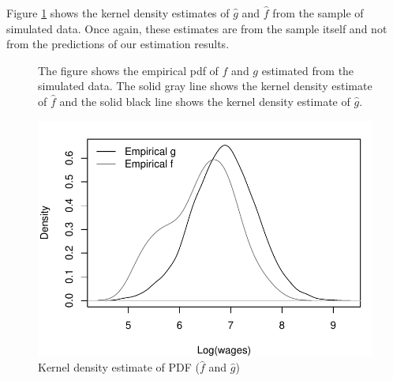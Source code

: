 \documentclass[11pt,letterpaper]{article}
\newcommand{\floatintro}[1]{
  
  \vspace*{0.1in}
  
  {\footnotesize

    #1
    
  }
  
  \vspace*{0.1in} }
\begin{document}
\begin{enumerate}
  Figure \ref{fig:Gdens_sim} shows the kernel density estimates of
  $\hat g$ and $\hat f$ from the sample of simulated data. Once again,
  these estimates are from the sample itself and not from the
  predictions of our estimation results.
  \begin{figure}[htbp!]
    \floatintro{The figure shows the empirical pdf of $f$ and $g$
      estimated from the simulated data. The solid gray line shows the
      kernel density estimate of $\hat f$ and the solid black line
      shows the kernel density estimate of $\hat g$.}  \centering
    \includegraphics[scale=.6]{./pics/FG_density_sim.pdf}
    \caption{Kernel density estimate of PDF ($\hat f$ and $\hat g$)}
    \label{fig:Gdens_sim}
  \end{figure}


\end{enumerate}
\end{document}
